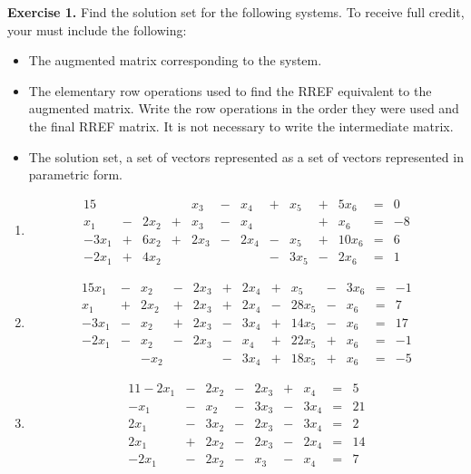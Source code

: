\documentclass[12pt]{article}
\begin{document}
\textbf{Exercise 1.} Find the solution set for the following systems. To receive full credit, your must include the following:
\begin{itemize}
\item The augmented matrix corresponding to the system.
\item The elementary row operations used to find the RREF equivalent to the augmented matrix. Write the row operations in the order they were used and the final RREF matrix. It is not necessary to write the intermediate matrix.
\item The solution set, a set of vectors represented as a set of vectors represented in parametric form.
\end{itemize} 

\begin{enumerate}
\item \begin{alignat*}{15}
&{}{}&&{}{}&x_{3} &{}-{}& x_{4} &{}+{}& x_{5} &{}+{}& 5 x_{6} &{}={}&0\\ 
x_{1} &{}-{}& 2 x_{2} &{}+{}& x_{3} &{}-{}& x_{4}&{}{}& &{}+{}& x_{6} &{}={}&-8\\ 
- 3 x_{1} &{}+{}& 6 x_{2} &{}+{}& 2 x_{3} &{}-{}& 2 x_{4} &{}-{}& x_{5} &{}+{}& 10 x_{6} &{}={}&6\\ 
- 2 x_{1} &{}+{}& 4 x_{2}&{}{}&&{}{}& &{}-{}& 3 x_{5} &{}-{}& 2 x_{6} &{}={}&1 
\end{alignat*}

\item \begin{alignat*}{15}
x_{1} &{}-{}& x_{2} &{}-{}& 2 x_{3} &{}+{}& 2 x_{4} &{}+{}& x_{5} &{}-{}& 3 x_{6} &{}={}&-1\\ 
x_{1} &{}+{}& 2 x_{2} &{}+{}& 2 x_{3} &{}+{}& 2 x_{4} &{}-{}& 28 x_{5} &{}-{}& x_{6} &{}={}&7\\ 
- 3 x_{1} &{}-{}& x_{2} &{}+{}& 2 x_{3} &{}-{}& 3 x_{4} &{}+{}& 14 x_{5} &{}-{}& x_{6} &{}={}&17\\ 
- 2 x_{1} &{}-{}& x_{2} &{}-{}& 2 x_{3} &{}-{}& x_{4} &{}+{}& 22 x_{5} &{}+{}& x_{6} &{}={}&-1\\ 
&{}{}&- x_{2}&{}{}& &{}-{}& 3 x_{4} &{}+{}& 18 x_{5} &{}+{}& x_{6} &{}={}&-5 
\end{alignat*}

\item \begin{alignat*}{11}
- 2 x_{1} &{}-{}& 2 x_{2} &{}-{}& 2 x_{3} &{}+{}& x_{4} &{}={}&5\\ 
- x_{1} &{}-{}& x_{2} &{}-{}& 3 x_{3} &{}-{}& 3 x_{4} &{}={}&21\\ 
2 x_{1} &{}-{}& 3 x_{2} &{}-{}& 2 x_{3} &{}-{}& 3 x_{4} &{}={}&2\\ 
2 x_{1} &{}+{}& 2 x_{2} &{}-{}& 2 x_{3} &{}-{}& 2 x_{4} &{}={}&14\\ 
- 2 x_{1} &{}-{}& 2 x_{2} &{}-{}& x_{3} &{}-{}& x_{4} &{}={}&7
\end{alignat*}
\end{enumerate}
\end{document}
